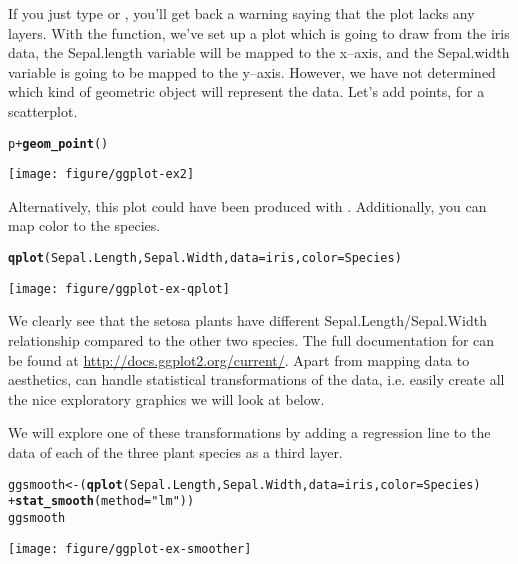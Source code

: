 \documentclass{article}\usepackage[]{graphicx}\usepackage[usenames,dvipsnames]{color}
\makeatletter
\def\maxwidth{ %
  \ifdim\Gin@nat@width>\linewidth
    \linewidth
  \else
    \Gin@nat@width
  \fi
}
\newcommand{\hlstr}[1]{\textcolor[rgb]{0.192,0.494,0.8}{#1}}%
\newcommand{\hlopt}[1]{\textcolor[rgb]{0,0,0}{#1}}%
\newcommand{\hlstd}[1]{\textcolor[rgb]{0.345,0.345,0.345}{#1}}%
\newcommand{\hlkwb}[1]{\textcolor[rgb]{0.69,0.353,0.396}{#1}}%
\newcommand{\hlkwc}[1]{\textcolor[rgb]{0.333,0.667,0.333}{#1}}%
\newcommand{\hlkwd}[1]{\textcolor[rgb]{0.737,0.353,0.396}{\textbf{#1}}}%
\newenvironment{kframe}{%
 \def\at@end@of@kframe{}%
 \ifinner\ifhmode%
  \def\at@end@of@kframe{\end{minipage}}%
  \begin{minipage}{\columnwidth}%
 \fi\fi%
 \def\FrameCommand##1{\hskip\@totalleftmargin \hskip-\fboxsep
 \colorbox{shadecolor}{##1}\hskip-\fboxsep
     \hskip-\linewidth \hskip-\@totalleftmargin \hskip\columnwidth}%
 \MakeFramed {\advance\hsize-\width
   \@totalleftmargin\z@ \linewidth\hsize
   \@setminipage}}%
 {\par\unskip\endMakeFramed%
 \at@end@of@kframe}
\newenvironment{knitrout}{}{} %
\makeatother
\begin{document}
If you just type  or , you'll get back a warning saying
that the plot lacks  any layers. With the  function, 
we've set up a plot which is going to draw from the iris data, 
the Sepal.length variable will be mapped to the x--axis, and the Sepal.width
variable is going to be mapped to the y--axis. 
However, we have not determined which kind of geometric object will represent the data. 
Let's add points, for a scatterplot.

\begin{knitrout}
\color{fgcolor}\begin{kframe}
\begin{alltt}
 \hlstd{p} \hlopt{+} \hlkwd{geom_point}\hlstd{()}
\end{alltt}
\end{kframe}
\texttt{[image: figure/ggplot-ex2]} 

\end{knitrout}

Alternatively, this plot could have been produced with .
Additionally, you can map color to the species. 


\begin{knitrout}
\color{fgcolor}\begin{kframe}
\begin{alltt}
\hlkwd{qplot}\hlstd{(Sepal.Length, Sepal.Width,} \hlkwc{data} \hlstd{= iris,} \hlkwc{color} \hlstd{= Species)}
\end{alltt}
\end{kframe}
\texttt{[image: figure/ggplot-ex-qplot]} 

\end{knitrout}

We clearly see that the  setosa plants have different Sepal.Length/Sepal.Width 
relationship compared to the other two species. The full documentation for  can be found at \url{http://docs.ggplot2.org/current/}.
Apart from mapping data to aesthetics,  
can handle statistical transformations of the data, i.e. easily create all 
the nice exploratory graphics we will look at below.

We will explore one of these transformations by adding a regression line
to the data of each of the three plant species as a third layer.


\begin{knitrout}
\color{fgcolor}\begin{kframe}
\begin{alltt}
\hlstd{ggsmooth} \hlkwb{<-} \hlstd{(}\hlkwd{qplot}\hlstd{(Sepal.Length, Sepal.Width,} \hlkwc{data} \hlstd{= iris,} \hlkwc{color} \hlstd{= Species)}
\hlopt{+} \hlkwd{stat_smooth}\hlstd{(}\hlkwc{method} \hlstd{=} \hlstr{"lm"}\hlstd{))}
\hlstd{ggsmooth}
\end{alltt}
\end{kframe}
\texttt{[image: figure/ggplot-ex-smoother]} 

\end{knitrout}
\end{document}
